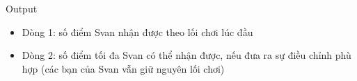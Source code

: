 Output
\begin{itemize}
	\item Dòng 1: số điểm Svan nhận được theo lối chơi lúc đầu
	\item Dòng 2: số điểm tối đa Svan có thể nhận được, nếu đưa ra sự điều chỉnh phù hợp (các bạn của Svan vẫn giữ nguyên lối chơi)
\end{itemize}